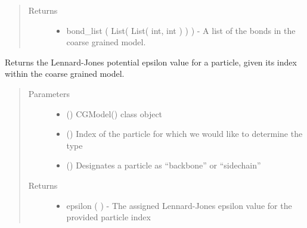 \documentclass[letterpaper,12pt,english,openany,oneside]{sphinxmanual}
\begin{document}
\begin{fulllineitems}
\begin{fulllineitems}
\begin{quote}
\begin{description}
\item[{Returns}] \leavevmode
\begin{itemize}
\item {} 
bond\_list ( List( List( int, int ) ) ) - A list of the bonds in the coarse grained model.

\end{itemize}


\end{description}\end{quote}

\end{fulllineitems}


\begin{fulllineitems}
\label{\detokenize{cg_model:cg_model.cgmodel.CGModel.get_epsilon}}
Returns the Lennard-Jones potential epsilon value for a particle, given its index within the coarse grained model.
\begin{quote}\begin{description}
\item[{Parameters}] \leavevmode\begin{itemize}
\item {} 
 () \textendash{} CGModel() class object

\item {} 
 () \textendash{} Index of the particle for which we would like to determine the type

\item {} 
 () \textendash{} Designates a particle as “backbone” or “sidechain”

\end{itemize}

\item[{Returns}] \leavevmode
\begin{itemize}
\item {} 
epsilon (  ) - The assigned Lennard-Jones epsilon value for the provided particle index


\end{itemize}
\end{description}
\end{quote}
\end{fulllineitems}
\end{fulllineitems}
\end{document}
